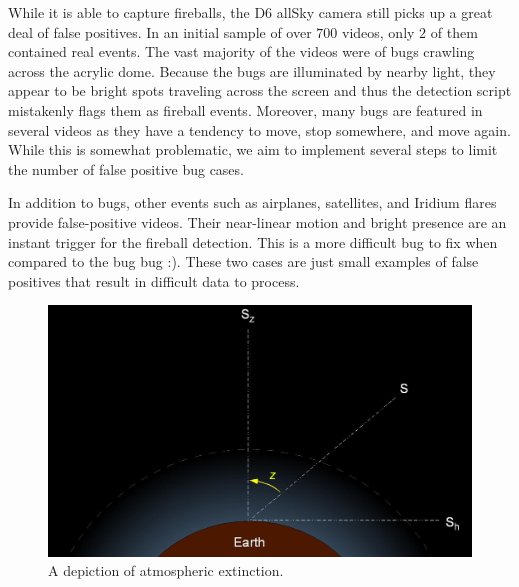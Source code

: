 While it is able to capture fireballs, the D6 allSky camera still picks up a great deal of false positives.
In an initial sample of over $700$ videos, only $2$ of them contained real events.
The vast majority of the videos were of bugs crawling across the acrylic dome.
Because the bugs are illuminated by nearby light, they appear to be bright spots traveling across the screen and thus the detection script mistakenly flags them as fireball events.
Moreover, many bugs are featured in several videos as they have a tendency to move, stop somewhere, and move again.
While this is somewhat problematic, we aim to implement several steps to limit the number of false positive bug cases.

In addition to bugs, other events such as airplanes, satellites, and Iridium flares provide false-positive videos.
Their near-linear motion and bright presence are an instant trigger for the fireball detection.
This is a more difficult bug to fix when compared to the bug bug :).
These two cases are just small examples of false positives that result in difficult data to process.

\begin{figure}[ht!]
  \centering
  \includegraphics[scale=0.4]{images/extinction.JPG}
  \caption{A depiction of atmospheric extinction.}
  \label{extinc}
\end{figure}

